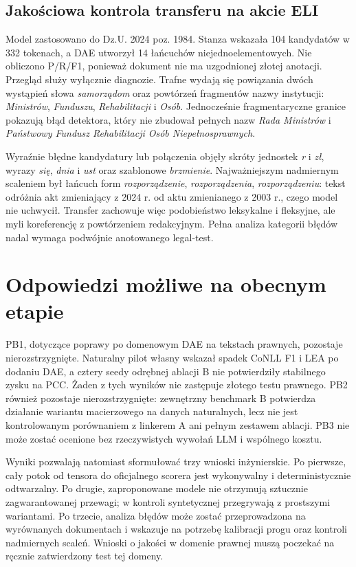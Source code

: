 \subsection{Jakościowa kontrola transferu na akcie ELI}

Model zastosowano do Dz.U. 2024 poz. 1984. Stanza wskazała 104 kandydatów w 332 tokenach, a DAE utworzył 14 łańcuchów niejednoelementowych. Nie obliczono P/R/F1, ponieważ dokument nie ma uzgodnionej złotej anotacji. Przegląd służy wyłącznie diagnozie. Trafne wydają się powiązania dwóch wystąpień słowa \emph{samorządom} oraz powtórzeń fragmentów nazwy instytucji: \emph{Ministrów}, \emph{Funduszu}, \emph{Rehabilitacji} i \emph{Osób}. Jednocześnie fragmentaryczne granice pokazują błąd detektora, który nie zbudował pełnych nazw \emph{Rada Ministrów} i \emph{Państwowy Fundusz Rehabilitacji Osób Niepełnosprawnych}.

Wyraźnie błędne kandydatury lub połączenia objęły skróty jednostek \emph{r} i \emph{zł}, wyrazy \emph{się}, \emph{dnia} i \emph{ust} oraz szablonowe \emph{brzmienie}. Najważniejszym nadmiernym scaleniem był łańcuch form \emph{rozporządzenie}, \emph{rozporządzenia}, \emph{rozporządzeniu}: tekst odróżnia akt zmieniający z 2024 r. od aktu zmienianego z 2003 r., czego model nie uchwycił. Transfer zachowuje więc podobieństwo leksykalne i fleksyjne, ale myli koreferencję z powtórzeniem redakcyjnym. Pełna analiza kategorii błędów nadal wymaga podwójnie anotowanego legal-test.

\section{Odpowiedzi możliwe na obecnym etapie}

PB1, dotyczące poprawy po domenowym DAE na tekstach prawnych, pozostaje nierozstrzygnięte. Naturalny pilot własny wskazał spadek CoNLL F1 i LEA po dodaniu DAE, a cztery seedy odrębnej ablacji B nie potwierdziły stabilnego zysku na PCC. Żaden z tych wyników nie zastępuje złotego testu prawnego. PB2 również pozostaje nierozstrzygnięte: zewnętrzny benchmark B potwierdza działanie wariantu macierzowego na danych naturalnych, lecz nie jest kontrolowanym porównaniem z linkerem A ani pełnym zestawem ablacji. PB3 nie może zostać ocenione bez rzeczywistych wywołań LLM i wspólnego kosztu.

Wyniki pozwalają natomiast sformułować trzy wnioski inżynierskie. Po pierwsze, cały potok od tensora do oficjalnego scorera jest wykonywalny i deterministycznie odtwarzalny. Po drugie, zaproponowane modele nie otrzymują sztucznie zagwarantowanej przewagi; w kontroli syntetycznej przegrywają z prostszymi wariantami. Po trzecie, analiza błędów może zostać przeprowadzona na wyrównanych dokumentach i wskazuje na potrzebę kalibracji progu oraz kontroli nadmiernych scaleń. Wnioski o jakości w domenie prawnej muszą poczekać na ręcznie zatwierdzony test tej domeny.

